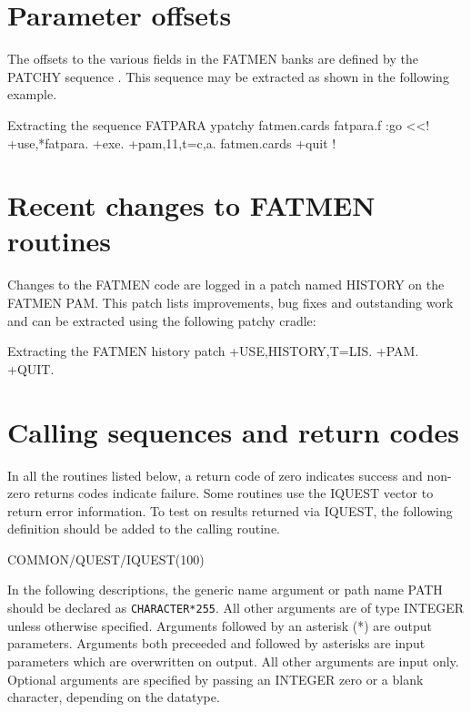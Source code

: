 \section{Parameter offsets}
The offsets to the various fields in the FATMEN banks are defined by the
PATCHY sequence . This sequence may be extracted as shown in the
following example.
\label{EXTRACT-FATPARA}
\begin{XMPt}{Extracting the sequence FATPARA}
ypatchy fatmen.cards fatpara.f :go <<!
+use,*fatpara.
+exe.
+pam,11,t=c,a. fatmen.cards
+quit
!
\end{XMPt}
\section{Recent changes to FATMEN routines}
\par
Changes to the FATMEN code are logged in a patch named HISTORY on the
FATMEN PAM. This patch lists improvements, bug fixes and outstanding
work and can be extracted using the following patchy cradle:
\begin{XMPt}{Extracting the FATMEN history patch}
+USE,HISTORY,T=LIS.
+PAM.
+QUIT.
\end{XMPt}
\section{Calling sequences and return codes}
\par
{}
In all the routines listed below, a return code of zero indicates
success and non-zero returns codes indicate failure. Some routines
use the IQUEST vector to return error information. To test on results
returned via IQUEST, the following definition should be added to the
calling routine.
\begin{XMP}
      COMMON/QUEST/IQUEST(100)
\end{XMP}
\par
In the following descriptions, the generic name argument 
or path name PATH
should be declared as {\tt CHARACTER*255}.
All other arguments are of type INTEGER
unless otherwise specified. Arguments followed by an asterisk (*)
are output parameters. Arguments both preceeded and followed by
asterisks are input parameters which are overwritten on output. All
other arguments are input only.
Optional arguments are specified by passing an INTEGER
zero or a blank character, depending on the datatype.
